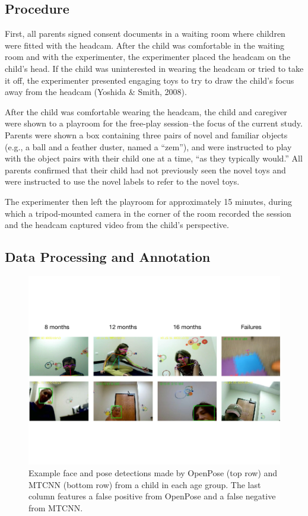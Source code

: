 \documentclass[10pt, letterpaper]{article}
\begin{document}
\subsection{Procedure}\label{procedure}

First, all parents signed consent documents in a waiting room where
children were fitted with the headcam. After the child was comfortable
in the waiting room and with the experimenter, the experimenter placed
the headcam on the child's head. If the child was uninterested in
wearing the headcam or tried to take it off, the experimenter presented
engaging toys to try to draw the child's focus away from the headcam
(Yoshida \& Smith, 2008).

After the child was comfortable wearing the headcam, the child and
caregiver were shown to a playroom for the free-play session--the focus
of the current study. Parents were shown a box containing three pairs of
novel and familiar objects (e.g., a ball and a feather duster, named a
``zem''), and were instructed to play with the object pairs with their
child one at a time, ``as they typically would.'' All parents confirmed
that their child had not previously seen the novel toys and were
instructed to use the novel labels to refer to the novel toys.

The experimenter then left the playroom for approximately 15 minutes,
during which a tripod-mounted camera in the corner of the room recorded
the session and the headcam captured video from the child's perspective.

\subsection{Data Processing and
Annotation}\label{data-processing-and-annotation}

\begin{figure}
\includegraphics[width=6in]{images/detector_samples_banner.pdf}
\caption{\label{fig:frames} Example face and pose detections made by OpenPose (top row) and MTCNN (bottom row) from a child in each age group. The last column features a false positive from OpenPose and a false negative from MTCNN.}
\end{figure}
\end{document}

